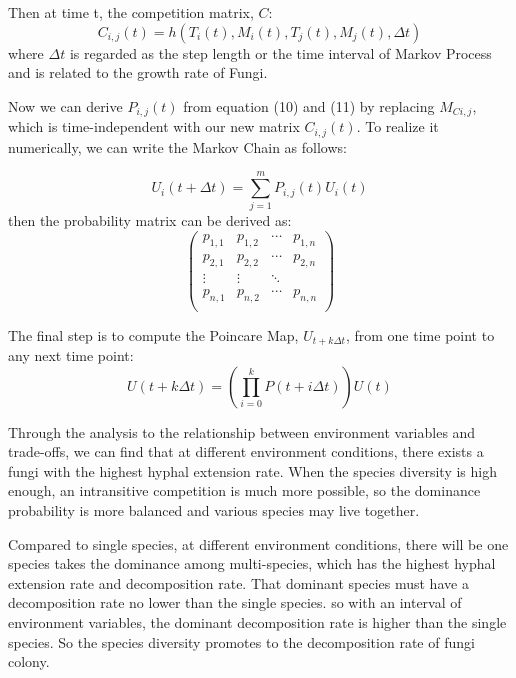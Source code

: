 \documentclass[12pt]{article}
\begin{document}
Then at time t, the competition matrix, $C$:
\begin{equation}
	C_{i,j}(t)=h(T_{i}(t), M_{i}(t), T_{j}(t), M_{j}(t), \Delta t)
\end{equation}
where $\Delta t$ is regarded as the step length or the time interval of Markov Process and is related to the growth rate of Fungi. 

Now we can derive $P_{i,j}(t)$ from equation (10) and (11) by replacing $M_{C i,j}$, which is time-independent with our new matrix $C_{i,j}(t)$. To realize it numerically, we can write the Markov Chain as follows: 

\begin{equation}
	U_{i}(t+\Delta t)=\sum^{m}_{j=1} P_{i,j}(t)U_{i}(t)
\end{equation}
then the probability matrix can be derived as:
\begin{equation}
	\begin{pmatrix}
		p_{1,1}&p_{1,2}  & \cdots  &p_{1,n}  \\ 
		p_{2,1}&p_{2,2}  & \cdots  &p_{2,n} \\ 
		\vdots &\vdots  & \ddots\\ 
		p_{n,1}&p_{n,2}  & \cdots  &p_{n,n} \\
	\end{pmatrix}
\end{equation}

The final step is to compute the Poincare Map, $U_{t+k\Delta t}$, from one time point to any next time point:
\begin{equation}
	U(t+k\Delta t)=(\prod^{k}_{i=0}P(t+i\Delta t))U(t)
\end{equation}

Through the analysis to the relationship between environment variables and trade-offs, we can find that at different environment conditions, there exists a fungi with the highest hyphal extension rate. When the species diversity is high enough, an intransitive competition is much more possible, so the dominance probability is more balanced and various species may live together. 

Compared to single species, at different environment conditions, there will be one species takes the dominance among multi-species, which has the highest hyphal extension rate and decomposition rate. That dominant species must have a decomposition rate no lower than the single species. so with an interval of environment variables, the dominant decomposition rate is higher than the single species. So the species diversity promotes to the decomposition rate of fungi colony.
\end{document}
